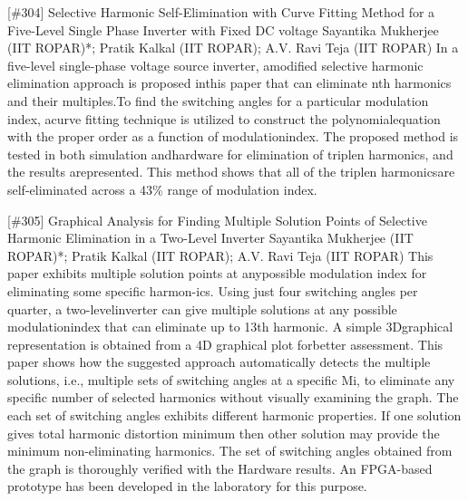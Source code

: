 {} \begin{abstract_online} {[\#304] Selective Harmonic Self-Elimination with Curve Fitting Method for a Five-Level Single Phase Inverter with Fixed DC voltage} {} {Sayantika Mukherjee (IIT ROPAR)*; Pratik Kalkal (IIT ROPAR); A.V. Ravi Teja (IIT ROPAR)} {} In a five-level single-phase voltage source inverter, amodified selective harmonic elimination approach is proposed inthis paper that can eliminate nth harmonics and their multiples.To find the switching angles for a particular modulation index, acurve fitting technique is utilized to construct the polynomialequation with the proper order as a function of modulationindex. The proposed method is tested in both simulation andhardware for elimination of triplen harmonics, and the results arepresented. This method shows that all of the triplen harmonicsare self-eliminated across a 43\% range of modulation index. \end{abstract_online} 
{} \begin{abstract_online} {[\#305] Graphical Analysis for Finding Multiple Solution Points of Selective Harmonic Elimination in a Two-Level Inverter} {} {Sayantika Mukherjee (IIT ROPAR)*; Pratik Kalkal (IIT ROPAR); A.V. Ravi Teja (IIT ROPAR)} {} This paper exhibits multiple solution points at anypossible modulation index for eliminating some specific harmon-ics. Using just four switching angles per quarter, a two-levelinverter can give multiple solutions at any possible modulationindex that can eliminate up to 13th harmonic. A simple 3Dgraphical representation is obtained from a 4D graphical plot forbetter assessment. This paper shows how the suggested approach automatically detects the multiple solutions, i.e., multiple sets of switching angles at a specific Mi, to eliminate any specific number of selected harmonics without visually examining the graph. The each set of switching angles exhibits different harmonic properties. If one solution gives total harmonic distortion minimum then other solution may provide the minimum non-eliminating harmonics. The set of switching angles obtained from the graph is thoroughly verified with the Hardware results. An FPGA-based prototype has been developed in the laboratory for this purpose. \end{abstract_online} 
